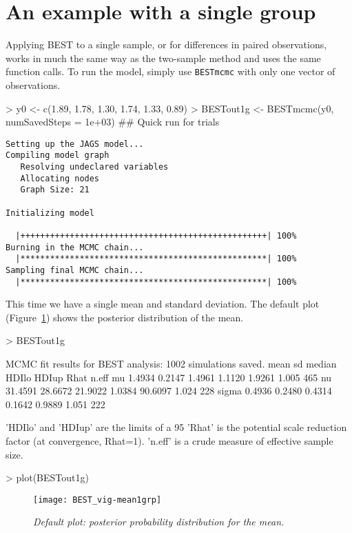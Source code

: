 \documentclass[a4paper]{article}
\begin{document}
\section{An example with a single group}
\label{sec:1grp}

Applying BEST to a single sample, or for differences in paired observations, works in much the same way as the two-sample method and uses the same function calls. To run the model, simply use \texttt{BESTmcmc} with only one vector of observations.
\begin{Schunk}
\begin{Sinput}
> y0 <- c(1.89, 1.78, 1.30, 1.74, 1.33, 0.89)
> BESTout1g <- BESTmcmc(y0, numSavedSteps = 1e+03)  ## Quick run for trials
\end{Sinput}
\end{Schunk}
\begin{verbatim}
Setting up the JAGS model...
Compiling model graph
   Resolving undeclared variables
   Allocating nodes
   Graph Size: 21

Initializing model

  |++++++++++++++++++++++++++++++++++++++++++++++++++| 100%
Burning in the MCMC chain...
  |**************************************************| 100%
Sampling final MCMC chain...
  |**************************************************| 100%
\end{verbatim}

This time we have a single mean and standard deviation. The default plot (Figure~\ref{fig:mean1g}) shows the posterior distribution of the mean. 
\begin{Schunk}
\begin{Sinput}
> BESTout1g
\end{Sinput}
\begin{Soutput}
MCMC fit results for BEST analysis:
1002 simulations saved.
         mean      sd  median  HDIlo   HDIup  Rhat n.eff
mu     1.4934  0.2147  1.4961 1.1120  1.9261 1.005   465
nu    31.4591 28.6672 21.9022 1.0384 90.6097 1.024   228
sigma  0.4936  0.2480  0.4314 0.1642  0.9889 1.051   222

'HDIlo' and 'HDIup' are the limits of a 95% HDI credible interval.
'Rhat' is the potential scale reduction factor (at convergence, Rhat=1).
'n.eff' is a crude measure of effective sample size.
\end{Soutput}
\begin{Sinput}
> plot(BESTout1g)
\end{Sinput}
\end{Schunk}
\begin{figure}[H]
  \centering
  \texttt{[image: BEST\_vig-mean1grp]}
  \caption{\it Default plot: posterior probability distribution for the mean.}
  \label{fig:mean1g}
\end{figure}
\end{document}
